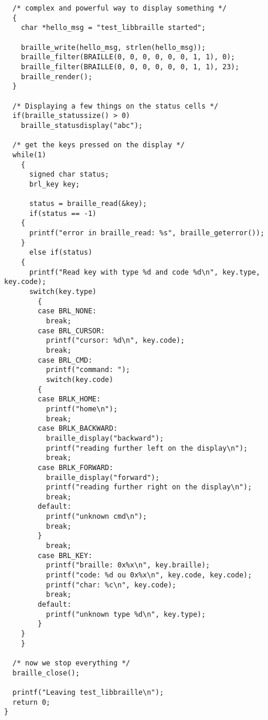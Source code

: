 \documentclass[12pt,a4paper]{article}
\begin{document}
\begin{verbatim}
  /* complex and powerful way to display something */
  {
    char *hello_msg = "test_libbraille started";

    braille_write(hello_msg, strlen(hello_msg)); 
    braille_filter(BRAILLE(0, 0, 0, 0, 0, 0, 1, 1), 0);
    braille_filter(BRAILLE(0, 0, 0, 0, 0, 0, 1, 1), 23);
    braille_render();
  }

  /* Displaying a few things on the status cells */
  if(braille_statussize() > 0)
    braille_statusdisplay("abc");

  /* get the keys pressed on the display */
  while(1)
    {
      signed char status;
      brl_key key;
      
      status = braille_read(&key);
      if(status == -1)
	{
	  printf("error in braille_read: %s", braille_geterror());
	}
      else if(status)
	{
	  printf("Read key with type %d and code %d\n", key.type, key.code);
	  switch(key.type)
	    {
	    case BRL_NONE:
	      break;
	    case BRL_CURSOR:
	      printf("cursor: %d\n", key.code);
	      break;
	    case BRL_CMD:
	      printf("command: ");
	      switch(key.code)
		{
		case BRLK_HOME:
		  printf("home\n");
		  break;
		case BRLK_BACKWARD:
		  braille_display("backward");
		  printf("reading further left on the display\n");
		  break;
		case BRLK_FORWARD:
		  braille_display("forward");
		  printf("reading further right on the display\n");
		  break;
		default:
		  printf("unknown cmd\n");
		  break;
		}
	      break;
	    case BRL_KEY:
	      printf("braille: 0x%x\n", key.braille);
	      printf("code: %d ou 0x%x\n", key.code, key.code);
	      printf("char: %c\n", key.code);
	      break;
	    default:
	      printf("unknown type %d\n", key.type);
	    }
	}
    }

  /* now we stop everything */
  braille_close();

  printf("Leaving test_libbraille\n");
  return 0;
}
\end{verbatim}
\end{document}
